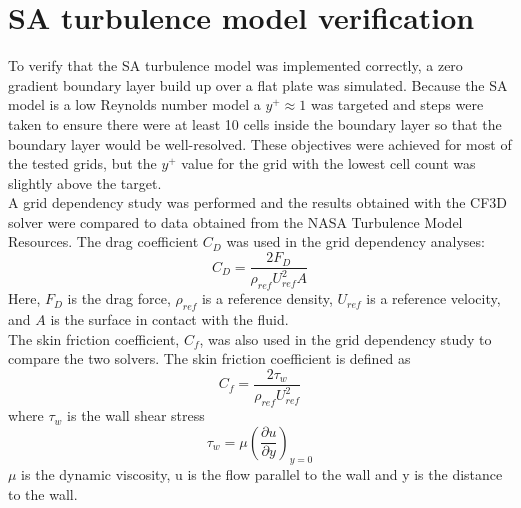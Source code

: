 %           
\chapter{SA turbulence model verification\label{ch:verification}}
To verify that the SA turbulence model was implemented correctly, a zero gradient boundary layer build up over a flat plate was simulated. Because the SA model is a low Reynolds number model a $y^+ \approx 1$ was targeted and steps were taken to ensure there were at least 10 cells inside the boundary layer so that the boundary layer would be well-resolved. These objectives were achieved for most of the tested grids, but the $y^+$ value for the grid with the lowest cell count was slightly above the target.\\
A grid dependency study was performed and the results obtained with the CF3D solver were compared to data obtained from the NASA Turbulence Model Resources\cite{NASA}. The drag coefficient $C_D$ was used in the grid dependency analyses:
\begin{equation}
C_D=\frac{2F_D}{\rho_{ref}U^2_{ref}A}
\label{eq:CD}
\end{equation}
Here, $F_D$ is the drag force, $\rho_{ref}$ is a reference density, $U_{ref}$ is a reference velocity, and $A$ is the surface in contact with the fluid.\\
The skin friction coefficient, $C_f$, was also used in the grid dependency study to compare the two solvers. The skin friction coefficient is defined as
\begin{equation}
  C_f = \frac{2\tau _w}{\rho_{ref}U^2_{ref}}
  \label{eq:CF}
\end{equation}
where $\tau _w$ is the wall shear stress
\begin{equation*}
  \tau_w = \mu \left( \frac{\partial u}{\partial y}\right)_{y=0}
\end{equation*}
$\mu$ is the dynamic viscosity, u is the flow parallel to the wall and y is the distance to the wall.

